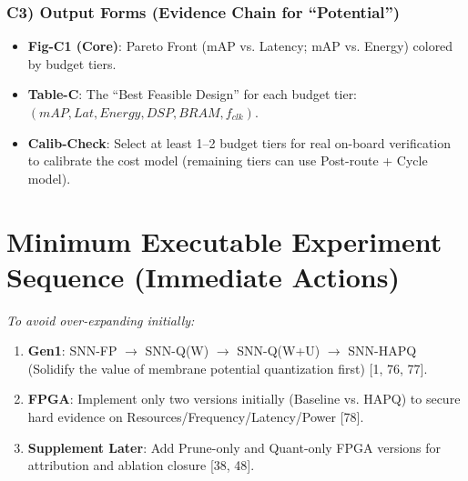 \documentclass[10pt,a4paper]{article}
\begin{document}
\subsubsection{C3) Output Forms (Evidence Chain for ``Potential'')}
\begin{itemize}
    \item \textbf{Fig-C1 (Core)}: Pareto Front (mAP vs. Latency; mAP vs. Energy) colored by budget tiers.
    \item \textbf{Table-C}: The ``Best Feasible Design'' for each budget tier: $(mAP, Lat, Energy, DSP, BRAM, f_{clk})$.
    \item \textbf{Calib-Check}: Select at least 1--2 budget tiers for real on-board verification to calibrate the cost model (remaining tiers can use Post-route + Cycle model).
\end{itemize}

\section*{Minimum Executable Experiment Sequence (Immediate Actions)}
\textit{To avoid over-expanding initially:}
\begin{enumerate}
    \item \textbf{Gen1}: SNN-FP $\to$ SNN-Q(W) $\to$ SNN-Q(W+U) $\to$ SNN-HAPQ (Solidify the value of membrane potential quantization first) [1, 76, 77].
    \item \textbf{FPGA}: Implement only two versions initially (Baseline vs. HAPQ) to secure hard evidence on Resources/Frequency/Latency/Power [78].
    \item \textbf{Supplement Later}: Add Prune-only and Quant-only FPGA versions for attribution and ablation closure [38, 48].
\end{enumerate}
\end{document}
